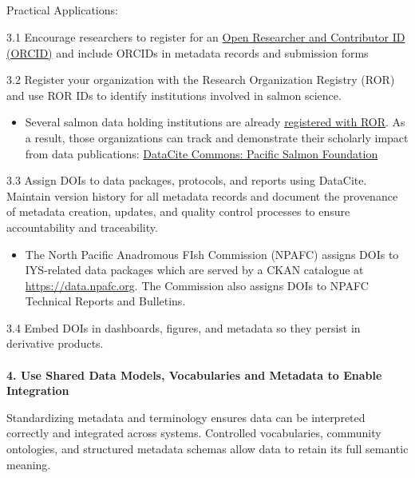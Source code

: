 \documentclass[
  letterpaper,
  DIV=11,
  numbers=noendperiod]{scrartcl}
\makeatletter
\let\oldparagraph\paragraph
\renewcommand{\paragraph}{
    \@ifstar
      \xxxParagraphStar
      \xxxParagraphNoStar
  }
\newcommand{\xxxParagraphStar}[1]{\oldparagraph*{#1}\mbox{}}
\newcommand{\xxxParagraphNoStar}[1]{\oldparagraph{#1}\mbox{}}
\let\oldsubparagraph\subparagraph
\renewcommand{\subparagraph}{
    \@ifstar
      \xxxSubParagraphStar
      \xxxSubParagraphNoStar
  }
\newcommand{\xxxSubParagraphStar}[1]{\oldsubparagraph*{#1}\mbox{}}
\newcommand{\xxxSubParagraphNoStar}[1]{\oldsubparagraph{#1}\mbox{}}
\providecommand{\tightlist}{%
  \setlength{\itemsep}{0pt}\setlength{\parskip}{0pt}}\usepackage{longtable,booktabs,array}
\makeatother
\begin{document}
\subparagraph{Practical Applications:}\label{practical-applications-2}

3.1 Encourage researchers to register for an
\href{https://orcid.org/}{Open Researcher and Contributor ID (ORCID)}
and include ORCIDs in metadata records and submission forms

3.2 Register your organization with the Research Organization Registry
(ROR) and use ROR IDs to identify institutions involved in salmon
science.

\begin{itemize}
\tightlist
\item
  Several salmon data holding institutions are already
  \href{https://ror.org/search?page=1&query=salmon}{registered with
  ROR}. As a result, those organizations can track and demonstrate their
  scholarly impact from data publications:
  \href{https://commons.datacite.org/ror.org/04901nj56}{DataCite
  Commons: Pacific Salmon Foundation}
\end{itemize}

3.3 Assign DOIs to data packages, protocols, and reports using DataCite.
Maintain version history for all metadata records and document the
provenance of metadata creation, updates, and quality control processes
to ensure accountability and traceability.

\begin{itemize}
\tightlist
\item
  The North Pacific Anadromous FIsh Commission (NPAFC) assigns DOIs to
  IYS-related data packages which are served by a CKAN catalogue at
  \url{https://data.npafc.org}. The Commission also assigns DOIs to
  NPAFC Technical Reports and Bulletins.
\end{itemize}

3.4 Embed DOIs in dashboards, figures, and metadata so they persist in
derivative products.

\paragraph{\texorpdfstring{\textbf{4. Use Shared Data Models,
Vocabularies and Metadata to Enable
Integration}}{4. Use Shared Data Models, Vocabularies and Metadata to Enable Integration}}\label{use-shared-data-models-vocabularies-and-metadata-to-enable-integration}

Standardizing metadata and terminology ensures data can be interpreted
correctly and integrated across systems. Controlled vocabularies,
community ontologies, and structured metadata schemas allow data to
retain its full semantic meaning.
\end{document}
